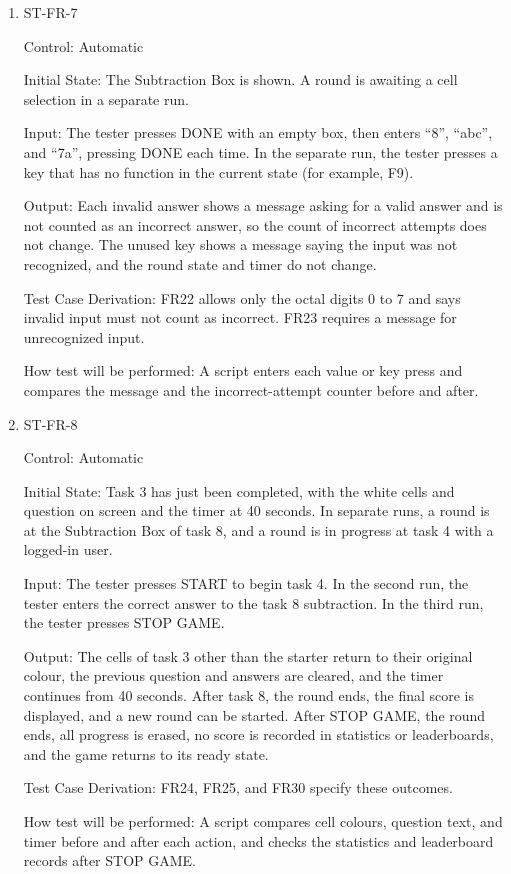 \documentclass[12pt, titlepage]{article}
\begin{document}
\begin{enumerate}
\item{ST-FR-7\\}

Control: Automatic

Initial State: The Subtraction Box is shown. A round is awaiting a cell selection in a separate run.

Input: The tester presses DONE with an empty box, then enters ``8'', ``abc'', and ``7a'', pressing DONE each time. In the separate run, the tester presses a key that has no function in the current state (for example, F9).

Output: Each invalid answer shows a message asking for a valid answer and is not counted as an incorrect answer, so the count of incorrect attempts does not change. The unused key shows a message saying the input was not recognized, and the round state and timer do not change.

Test Case Derivation: FR22 allows only the octal digits 0 to 7 and says invalid input must not count as incorrect. FR23 requires a message for unrecognized input.

How test will be performed: A script enters each value or key press and compares the message and the incorrect-attempt counter before and after.

\item{ST-FR-8\\}

Control: Automatic

Initial State: Task 3 has just been completed, with the white cells and question on screen and the timer at 40 seconds. In separate runs, a round is at the Subtraction Box of task 8, and a round is in progress at task 4 with a logged-in user.

Input: The tester presses START to begin task 4. In the second run, the tester enters the correct answer to the task 8 subtraction. In the third run, the tester presses STOP GAME.

Output: The cells of task 3 other than the starter return to their original colour, the previous question and answers are cleared, and the timer continues from 40 seconds. After task 8, the round ends, the final score is displayed, and a new round can be started. After STOP GAME, the round ends, all progress is erased, no score is recorded in statistics or leaderboards, and the game returns to its ready state.

Test Case Derivation: FR24, FR25, and FR30 specify these outcomes.

How test will be performed: A script compares cell colours, question text, and timer before and after each action, and checks the statistics and leaderboard records after STOP GAME.


\end{enumerate}
\end{document}
